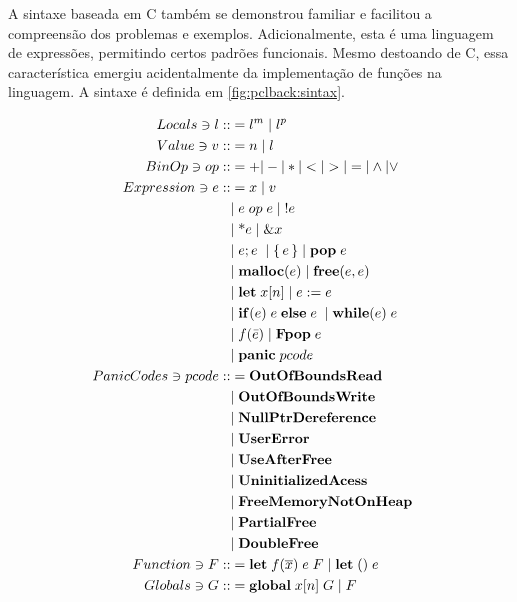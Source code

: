 A sintaxe baseada em C também se demonstrou familiar e facilitou a compreensão dos problemas e exemplos. Adicionalmente, esta é uma linguagem de expressões, permitindo certos padrões funcionais. Mesmo destoando de C, essa característica emergiu acidentalmente da implementação de funções na linguagem. A  sintaxe é definida em \ref{fig:pclback:sintax}.
\begin{figure*}[ht]
	\begingroup
		\begin{align*}
			Locals \ni l ::&= l^m \;|\; l^p &&\\ 
			Value \ni v ::&= n \;|\; l && \\
			BinOp \ni op ::&= + | - | * | < | > | = | \land | \lor \\
			Expression \ni e ::&= x \;|\; v \\
			&|\; e\; op\; e \;|\; !e  \\
			&|\; \text{*}e \;|\; \&x \\
			&|\; e;e \; \;|\; \{\,e\,\} \;|\; \mathbf{pop}\;e\; \\ 
			&|\; \mathbf{malloc}(e) \;|\; \mathbf{free}(e, e) \; \\ 
			&|\; \mathbf{let}\; x[n] \;|\; e := e \; \\
			&|\; \mathbf{if}(e) \; e \; \mathbf{else} \; e \; \;|\; \mathbf{while}(e) \; e \\
			&|\; f(\bar e) \;|\; \mathbf{Fpop}\;e\\ 
			&|\; \mathbf{panic}\;pcode \\ 
			PanicCodes \ni pcode ::&= \mathbf{OutOfBoundsRead}\\
			&|\; \mathbf{OutOfBoundsWrite}\\
			&|\; \mathbf{NullPtrDereference}\\
			&|\; \mathbf{UserError}\\
			&|\; \mathbf{UseAfterFree}\\
			&|\; \mathbf{UninitializedAcess}\\
			&|\; \mathbf{FreeMemoryNotOnHeap}\\
			&|\; \mathbf{PartialFree}\\
			&|\; \mathbf{DoubleFree}\\
			Function \ni F ::&= \mathbf{let} \; f(\overline{x})\; e \; F \; | \; \mathbf{let}\;() \; e \\
			Globals \ni G ::&= \mathbf{global}\; x[n] \;G \;|\; F
		\end{align*}
	\endgroup
	\caption{Sintaxe de $PCL_{back}$}
	\label{fig:pclback:sintax}
\end{figure*}
\FloatBarrier

